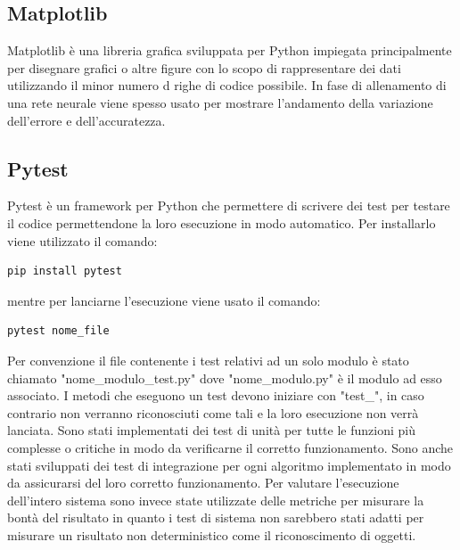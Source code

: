 \subsection{Matplotlib}
Matplotlib è una libreria grafica sviluppata per Python impiegata principalmente per disegnare grafici o altre figure con lo scopo di rappresentare dei dati utilizzando il minor numero d righe di codice possibile. In fase di allenamento di una rete neurale viene spesso usato per mostrare l'andamento della variazione dell'errore e dell'accuratezza.
\subsection{Pytest}
Pytest è un framework per Python che permettere di scrivere dei test per testare il codice permettendone la loro esecuzione in modo automatico. Per installarlo viene utilizzato il comando:
\begin{verbatim}
pip install pytest
\end{verbatim}
mentre per lanciarne l'esecuzione viene usato il comando:
\begin{verbatim}
pytest nome_file
\end{verbatim}
Per convenzione il file contenente i test relativi ad un solo modulo è stato chiamato "nome\_modulo\_test.py" dove "nome\_modulo.py" è il modulo ad esso associato. I metodi che eseguono un test devono iniziare con "test\_", in caso contrario non verranno riconosciuti come tali e la loro esecuzione non verrà lanciata. Sono stati implementati dei test di unità per tutte le funzioni più complesse o critiche in modo da verificarne il corretto funzionamento. Sono anche stati sviluppati dei test di integrazione per ogni algoritmo implementato in modo da assicurarsi del loro corretto funzionamento. Per valutare l'esecuzione dell'intero sistema sono invece state utilizzate delle metriche per misurare la bontà del risultato in quanto i test di sistema non sarebbero stati adatti per misurare un risultato non deterministico come il riconoscimento di oggetti.
